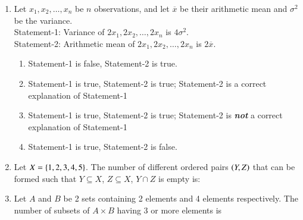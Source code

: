 \documentclass[journal,12pt,twocolumn]{IEEEtran}
\theoremstyle{remark}
\begin{document}
\begin{enumerate}
    \item Let $x_1, x_2, \dots, x_n$ be $n$ observations, and let $\overline{x}$ be their arithmetic mean and $\sigma^{2}$ be the variance.\\
    Statement-1: Variance of $2x_1, 2x_2, \dots, 2x_n$ is $4\sigma^{2}$.\\
    Statement-2: Arithmetic mean of $2x_1, 2x_2, \dots, 2x_n$ is $2\overline{x}$.
    
    \hfill{}
    \begin{enumerate}[label=(\alph*)]
        \item Statement-1 is false, Statement-2 is true.
        \item Statement-1 is true, Statement-2 is true; Statement-2 is a correct explanation of Statement-1
        \item Statement-1 is true, Statement-2 is true; Statement-2 is \textbf{\textit{not}} a correct explanation of Statement-1
        \item Statement-1 is true, Statement-2 is false.
    \end{enumerate}
    
    \item Let $X = \left\{1, 2, 3, 4, 5\right\}$. The number of different ordered pairs $\left(Y, Z\right)$ that can be formed such that $Y \subseteq X$, $Z \subseteq X$, $Y \cap Z$ is empty is:
    
    \hfill{}
    \begin{enumerate}[label=(\alph*)]
    \end{enumerate}
    
    \item Let $A$ and $B$ be 2 sets containing 2 elements and 4 elements respectively. The number of subsets of $A \times B$ having 3 or more elements is
    
    \hfill{}
    \begin{enumerate}[label=(\alph*)]
    \end{enumerate}
    

\end{enumerate}
\end{document}
